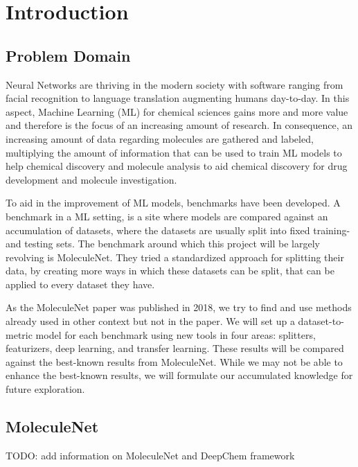 \section{Introduction}

\subsection{Problem Domain}

Neural Networks are thriving in the modern society with software ranging from facial recognition to language translation augmenting humans day-to-day.
In this aspect, Machine Learning (ML) for chemical sciences gains more and more value and therefore is the focus of an increasing amount of research.
In consequence, an increasing amount of data regarding molecules are gathered and labeled, multiplying the amount of information that can be used to train ML models to help chemical discovery and molecule analysis to aid chemical discovery for drug development and molecule investigation.

To aid in the improvement of ML models, benchmarks have been developed.
A benchmark in a ML setting, is a site where models are compared against an accumulation of datasets, where the datasets are usually split into fixed training- and testing sets.
The benchmark around which this project will be largely revolving is MoleculeNet.
They tried a standardized approach for splitting their data, by creating more ways in which these datasets can be split, that can be applied to every dataset they have.

As the MoleculeNet paper was published in 2018, we try to find and use methods already used in other context but not in the paper.
We will set up a dataset-to-metric model for each benchmark using new tools in four areas: splitters, featurizers, deep learning, and transfer learning.
These results will be compared against the best-known results from MoleculeNet. While we may not be able to enhance the best-known results, we will formulate our accumulated knowledge for future exploration.

\subsection{MoleculeNet}

TODO: add information on MoleculeNet and DeepChem framework